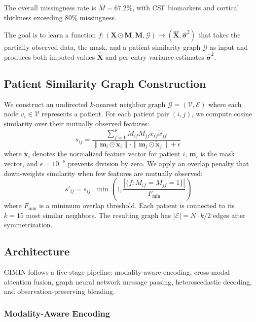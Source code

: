 \documentclass[journal,twoside,web]{ieeecolor}
\begin{document}
The overall missingness rate is $\bar{M} = 67.2\%$, with CSF biomarkers and cortical thickness exceeding 80\% missingness.

The goal is to learn a function $f: (\mathbf{X} \odot \mathbf{M}, \mathbf{M}, \mathcal{G}) \rightarrow (\hat{\mathbf{X}}, \hat{\boldsymbol{\sigma}}^2)$ that takes the partially observed data, the mask, and a patient similarity graph $\mathcal{G}$ as input and produces both imputed values $\hat{\mathbf{X}}$ and per-entry variance estimates $\hat{\boldsymbol{\sigma}}^2$.

\subsection{Patient Similarity Graph Construction}

We construct an undirected $k$-nearest neighbor graph $\mathcal{G} = (\mathcal{V}, \mathcal{E})$ where each node $v_i \in \mathcal{V}$ represents a patient. For each patient pair $(i, j)$, we compute cosine similarity over their mutually observed features:
\begin{equation}
    s_{ij} = \frac{\sum_{f=1}^{F} M_{if} M_{jf} \tilde{x}_{if} \tilde{x}_{jf}}{\|\mathbf{m}_i \odot \tilde{\mathbf{x}}_i\| \cdot \|\mathbf{m}_j \odot \tilde{\mathbf{x}}_j\| + \epsilon}
\end{equation}
where $\tilde{\mathbf{x}}_i$ denotes the normalized feature vector for patient $i$, $\mathbf{m}_i$ is the mask vector, and $\epsilon = 10^{-8}$ prevents division by zero. We apply an overlap penalty that down-weights similarity when few features are mutually observed:
\begin{equation}
    s'_{ij} = s_{ij} \cdot \min\left(1, \frac{|\{f : M_{if} = M_{jf} = 1\}|}{F_{\min}}\right)
\end{equation}
where $F_{\min}$ is a minimum overlap threshold. Each patient is connected to its $k = 15$ most similar neighbors. The resulting graph has $|\mathcal{E}| = N \cdot k / 2$ edges after symmetrization.

\subsection{Architecture}

GIMIN follows a five-stage pipeline: modality-aware encoding, cross-modal attention fusion, graph neural network message passing, heteroscedastic decoding, and observation-preserving blending.

\subsubsection{Modality-Aware Encoding}
\end{document}
